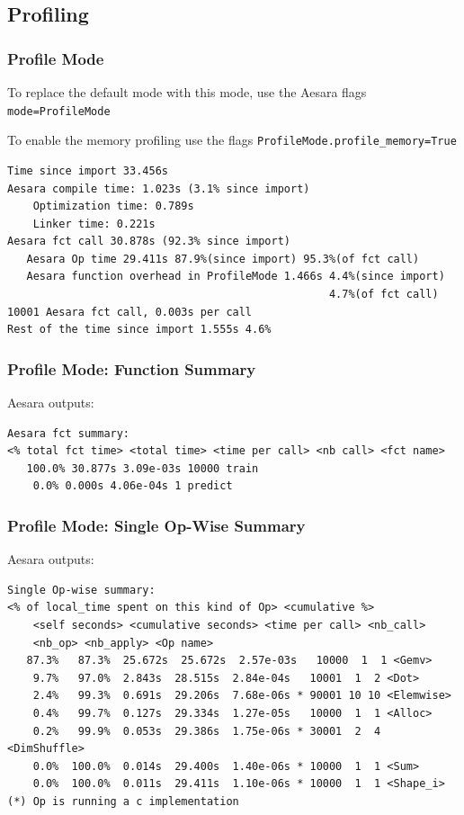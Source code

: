 \documentclass[a4paper,9pt]{beamer}
\begin{document}
\subsection{Profiling}
\begin{frame}[fragile]
\frametitle{Profile Mode}
To replace the default mode with this mode, use the Aesara flags \texttt{mode=ProfileMode}

To enable the memory profiling use the flags \texttt{ProfileMode.profile\_memory=True}
\begin{Verbatim}
Time since import 33.456s
Aesara compile time: 1.023s (3.1% since import)
    Optimization time: 0.789s
    Linker time: 0.221s
Aesara fct call 30.878s (92.3% since import)
   Aesara Op time 29.411s 87.9%(since import) 95.3%(of fct call)
   Aesara function overhead in ProfileMode 1.466s 4.4%(since import)
                                                  4.7%(of fct call)
10001 Aesara fct call, 0.003s per call
Rest of the time since import 1.555s 4.6%
\end{Verbatim}
\end{frame}

\begin{frame}[fragile]
\frametitle{Profile Mode: Function Summary}
Aesara outputs:
\vfill
\begin{Verbatim}
Aesara fct summary:
<% total fct time> <total time> <time per call> <nb call> <fct name>
   100.0% 30.877s 3.09e-03s 10000 train
    0.0% 0.000s 4.06e-04s 1 predict
\end{Verbatim}
\end{frame}

\begin{frame}[fragile]
\frametitle{Profile Mode: Single Op-Wise Summary}
Aesara outputs:
\vfill
\begin{Verbatim}
Single Op-wise summary:
<% of local_time spent on this kind of Op> <cumulative %>
    <self seconds> <cumulative seconds> <time per call> <nb_call>
    <nb_op> <nb_apply> <Op name>
   87.3%   87.3%  25.672s  25.672s  2.57e-03s   10000  1  1 <Gemv>
    9.7%   97.0%  2.843s  28.515s  2.84e-04s   10001  1  2 <Dot>
    2.4%   99.3%  0.691s  29.206s  7.68e-06s * 90001 10 10 <Elemwise>
    0.4%   99.7%  0.127s  29.334s  1.27e-05s   10000  1  1 <Alloc>
    0.2%   99.9%  0.053s  29.386s  1.75e-06s * 30001  2  4 <DimShuffle>
    0.0%  100.0%  0.014s  29.400s  1.40e-06s * 10000  1  1 <Sum>
    0.0%  100.0%  0.011s  29.411s  1.10e-06s * 10000  1  1 <Shape_i>
(*) Op is running a c implementation
\end{Verbatim}
\end{frame}
\end{document}
